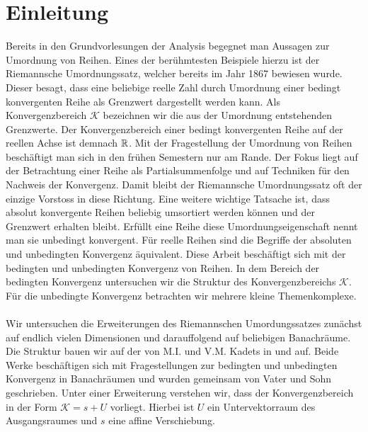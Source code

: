 \chapter{Einleitung}
Bereits in den Grundvorlesungen der Analysis begegnet man Aussagen zur Umordnung von Reihen. Eines der berühmtesten Beispiele hierzu ist der Riemannsche Umordnungssatz, welcher bereits im Jahr 1867 bewiesen wurde. 
Dieser besagt, dass eine beliebige reelle Zahl durch Umordnung einer bedingt konvergenten Reihe als Grenzwert dargestellt werden kann.
Als Konvergenzbereich $ \mathcal{K} $ bezeichnen wir die aus der Umordnung entstehenden Grenzwerte.
Der Konvergenzbereich einer bedingt konvergenten Reihe auf der reellen Achse ist demnach $ \mathbb{R} $. 
Mit der Fragestellung der Umordnung von Reihen beschäftigt man sich in den frühen Semestern nur am Rande.
Der Fokus liegt auf der Betrachtung einer Reihe als Partialsummenfolge und auf Techniken für den Nachweis der Konvergenz. Damit bleibt der Riemannsche Umordnungssatz oft der einzige Vorstoss in diese Richtung. 
Eine weitere wichtige Tatsache ist, dass absolut konvergente Reihen beliebig umsortiert werden können und der Grenzwert erhalten bleibt.
Erfüllt eine Reihe diese Umordnungseigenschaft nennt man sie unbedingt konvergent.
Für reelle Reihen sind die Begriffe der absoluten und unbedingten Konvergenz äquivalent. 
Diese Arbeit beschäftigt sich mit der bedingten und unbedingten Konvergenz von Reihen.
In dem Bereich der bedingten Konvergenz untersuchen wir die Struktur des Konvergenzbereichs $ \mathcal{K} $.
Für die unbedingte Konvergenz betrachten wir mehrere kleine Themenkomplexe.
\\
\\
Wir untersuchen die Erweiterungen des Riemannschen Umordungssatzes zunächst auf endlich vielen Dimensionen und darauffolgend auf beliebigen Banachräume.
Die Struktur bauen wir auf der von M.I. und V.M. Kadets in \cite{Kadets1991} und \cite{Kadets1997} auf.
Beide Werke beschäftigen sich mit Fragestellungen zur bedingten und unbedingten Konvergenz in Banachräumen und wurden gemeinsam von Vater und Sohn geschrieben. 
Unter einer Erweiterung verstehen wir, dass der Konvergenzbereich in der Form $ \mathcal{K} = s + U $ vorliegt. Hierbei ist $ U $ ein Untervektorraum des Ausgangsraumes und $ s $ eine affine Verschiebung. 
